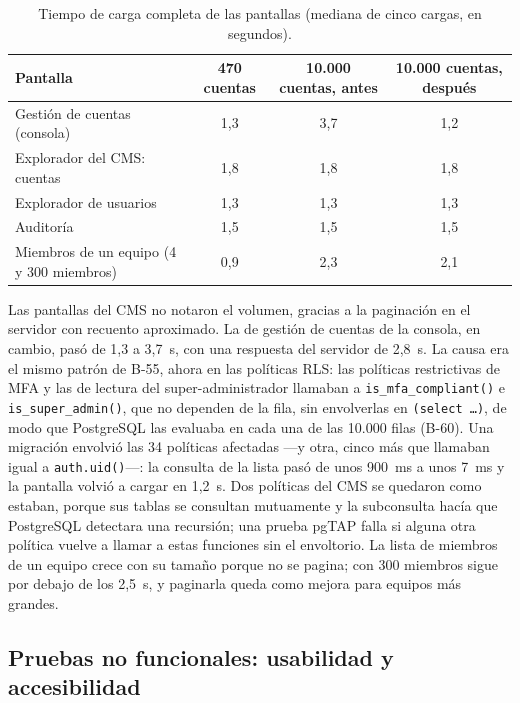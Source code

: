 \begin{table}[htbp]
  \centering
  \footnotesize
  \caption{Tiempo de carga completa de las pantallas (mediana de cinco cargas, en segundos).}
  \label{tab:pru-rendimiento}
  \begin{tabularx}{\textwidth}{@{}Xccc@{}}
    \toprule
    \textbf{Pantalla} & \textbf{470 cuentas} & \textbf{10.000 cuentas, antes} & \textbf{10.000 cuentas, después} \\
    \midrule
    Gestión de cuentas (consola) & 1,3 & 3,7 & 1,2 \\
    Explorador del CMS: cuentas & 1,8 & 1,8 & 1,8 \\
    Explorador de usuarios & 1,3 & 1,3 & 1,3 \\
    Auditoría & 1,5 & 1,5 & 1,5 \\
    Miembros de un equipo (4 y 300 miembros) & 0,9 & 2,3 & 2,1 \\
    \bottomrule
  \end{tabularx}
\end{table}

Las pantallas del CMS no notaron el volumen, gracias a la paginación en el
servidor con recuento aproximado. La de gestión de cuentas de la consola, en
cambio, pasó de 1,3 a 3,7~s, con una respuesta del servidor de 2,8~s. La
causa era el mismo patrón de B-55, ahora en las políticas RLS: las políticas
restrictivas de MFA y las de lectura del super-administrador llamaban a
\texttt{is\_mfa\_compliant()} e \texttt{is\_super\_admin()}, que no
dependen de la fila, sin envolverlas en \texttt{(select \ldots)}, de modo
que PostgreSQL las evaluaba en cada una de las 10.000 filas (B-60). Una
migración envolvió las 34 políticas afectadas ---y otra, cinco más que
llamaban igual a \texttt{auth.uid()}---: la consulta de la lista pasó de
unos 900~ms a unos 7~ms y la pantalla volvió a cargar en 1,2~s. Dos
políticas del CMS se quedaron como estaban, porque sus tablas se consultan
mutuamente y la subconsulta hacía que PostgreSQL detectara una recursión; una
prueba pgTAP falla si alguna otra política vuelve a llamar a estas funciones
sin el envoltorio. La lista de miembros de un equipo crece con su tamaño
porque no se pagina; con 300 miembros sigue por debajo de los 2,5~s, y
paginarla queda como mejora para equipos más grandes.

\subsection{Pruebas no funcionales: usabilidad y accesibilidad}
\label{sec:pru-usabilidad}

